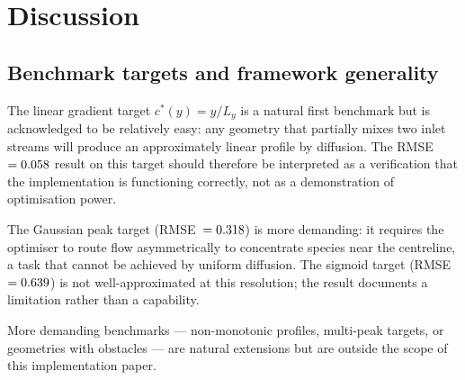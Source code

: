 \section{Discussion}
\label{sec:discussion}

\subsection{Benchmark targets and framework generality}
\label{sec:target_choice}
The linear gradient target $c^*(y)=y/L_y$ is a natural first
benchmark but is acknowledged to be relatively easy:
any geometry that partially mixes two inlet streams will
produce an approximately linear profile by diffusion.
The RMSE~$=0.058$ result on this target should therefore
be interpreted as a verification that the implementation
is functioning correctly, not as a demonstration of
optimisation power.

The Gaussian peak target (RMSE~$=0.318$) is more demanding:
it requires the optimiser to route flow asymmetrically to
concentrate species near the centreline, a task that cannot
be achieved by uniform diffusion.
The sigmoid target (RMSE~$=0.639$) is not well-approximated
at this resolution; the result documents a limitation rather
than a capability.

More demanding benchmarks --- non-monotonic profiles, multi-peak
targets, or geometries with obstacles --- are natural extensions
but are outside the scope of this implementation paper.

